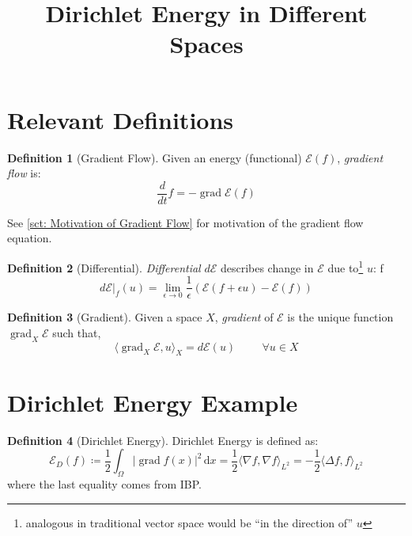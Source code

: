 \documentclass[a4paper]{article}
\title{Dirichlet Energy in Different Spaces}
\author{ }
\newcommand{\dx}{\, \text{d} x}
\theoremstyle{definition}
\newtheorem{definition}{Definition}
\DeclareMathOperator{\grad}{grad}
\begin{document}
\maketitle
\section{Relevant Definitions}
\begin{definition}[Gradient Flow]
    Given an energy (functional) $\mathcal{E}(f)$, \emph{gradient flow} is:
    \begin{equation}
        \frac{d}{dt}f = - \grad \mathcal{E}(f)
        \label{equ: Gradient Flow}
    \end{equation}
\end{definition}
See \ref{sct: Motivation of Gradient Flow} for motivation of the gradient flow equation.

\begin{definition}[Differential]
    \emph{Differential} $d\mathcal{E}$ describes change in $\mathcal{E}$ due to\footnote{analogous in traditional vector space would be ``in the direction of'' $u$} $u$:
 f  \begin{equation}
        d \mathcal{E}|_f(u) = \lim_{\epsilon \rightarrow 0} \frac{1}{\epsilon} \left( \mathcal{E}(f+\epsilon u) - \mathcal{E}(f) \right)
        \label{equ: Differential}
    \end{equation}
\end{definition}

\begin{definition}[Gradient]
    Given a space $X$, \emph{gradient} of $\mathcal{E}$ is the unique function $\grad_X \mathcal{E}$ such that,
    \begin{equation}
        \langle \grad_X \mathcal{E}, u \rangle_X = d \mathcal{E}(u) \hspace{1cm} \forall u \in X
        \label{equ: Gradient}
    \end{equation}
\end{definition}

\section{Dirichlet Energy Example}

\begin{definition}[Dirichlet Energy]
    Dirichlet Energy is defined as:
    \begin{equation}
        \mathcal{E}_D(f) \coloneqq \frac{1}{2} \int_{\Omega} |\grad f(x)|^2 \dx
        = \frac{1}{2} \langle \nabla f, \nabla f \rangle_{L^2}
        = -\frac{1}{2} \langle \Delta f, f \rangle_{L^2}
        \label{equ: Dirichlet Energy}
    \end{equation}
    where the last equality comes from IBP.
\end{definition}
\end{document}
